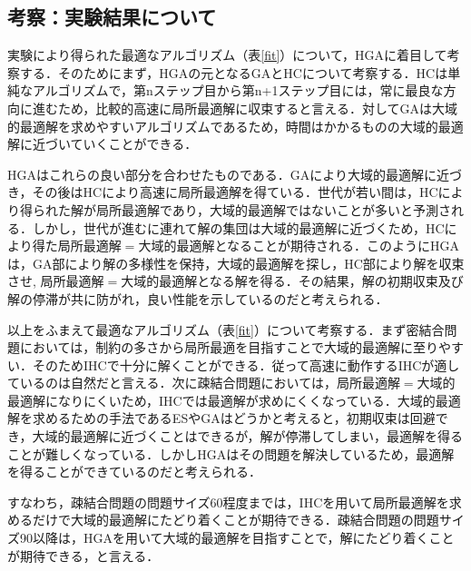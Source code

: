 \documentclass[a4j]{jarticle}
\begin{document}
\subsection{考察：実験結果について}
実験により得られた最適なアルゴリズム（表\ref{fit}）について，HGAに着目して考察する．そのためにまず，HGAの元となるGAとHCについて考察する．HCは単純なアルゴリズムで，第nステップ目から第n+1ステップ目には，常に最良な方向に進むため，比較的高速に局所最適解に収束すると言える．対してGAは大域的最適解を求めやすいアルゴリズムであるため，時間はかかるものの大域的最適解に近づいていくことができる．\par
HGAはこれらの良い部分を合わせたものである．GAにより大域的最適解に近づき，その後はHCにより高速に局所最適解を得ている．世代が若い間は，HCにより得られた解が局所最適解であり，大域的最適解ではないことが多いと予測される．しかし，世代が進むに連れて解の集団は大域的最適解に近づくため，HCにより得た局所最適解$=$大域的最適解となることが期待される．このようにHGAは，GA部により解の多様性を保持，大域的最適解を探し，HC部により解を収束させ,
局所最適解$=$大域的最適解となる解を得る．その結果，解の初期収束及び解の停滞が共に防がれ，良い性能を示しているのだと考えられる．\par
以上をふまえて最適なアルゴリズム（表\ref{fit}）について考察する．まず密結合問題においては，制約の多さから局所最適を目指すことで大域的最適解に至りやすい．そのためIHCで十分に解くことができる．従って高速に動作するIHCが適しているのは自然だと言える．次に疎結合問題においては，局所最適解$=$大域的最適解になりにくいため，IHCでは最適解が求めにくくなっている．大域的最適解を求めるための手法であるESやGAはどうかと考えると，初期収束は回避でき，大域的最適解に近づくことはできるが，解が停滞してしまい，最適解を得ることが難しくなっている．しかしHGAはその問題を解決しているため，最適解を得ることができているのだと考えられる．\par
すなわち，疎結合問題の問題サイズ60程度までは，IHCを用いて局所最適解を求めるだけで大域的最適解にたどり着くことが期待できる．疎結合問題の問題サイズ90以降は，HGAを用いて大域的最適解を目指すことで，解にたどり着くことが期待できる，と言える．
\end{document}
